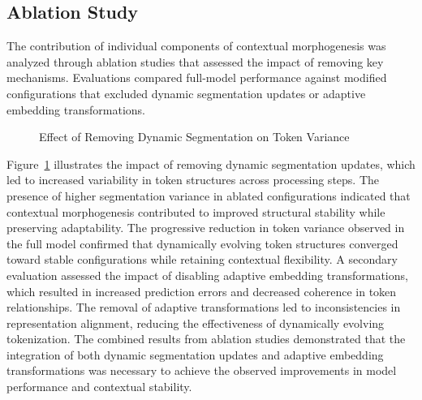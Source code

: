 \documentclass{article}
\begin{document}
\subsection{Ablation Study}

The contribution of individual components of contextual morphogenesis was analyzed through ablation studies that assessed the impact of removing key mechanisms. Evaluations compared full-model performance against modified configurations that excluded dynamic segmentation updates or adaptive embedding transformations.

\begin{figure}[t]
	\centering
	\caption{Effect of Removing Dynamic Segmentation on Token Variance}
	\label{fig:ablation_variance}
\end{figure}

Figure~\ref{fig:ablation_variance} illustrates the impact of removing dynamic segmentation updates, which led to increased variability in token structures across processing steps. The presence of higher segmentation variance in ablated configurations indicated that contextual morphogenesis contributed to improved structural stability while preserving adaptability. The progressive reduction in token variance observed in the full model confirmed that dynamically evolving token structures converged toward stable configurations while retaining contextual flexibility. A secondary evaluation assessed the impact of disabling adaptive embedding transformations, which resulted in increased prediction errors and decreased coherence in token relationships. The removal of adaptive transformations led to inconsistencies in representation alignment, reducing the effectiveness of dynamically evolving tokenization. The combined results from ablation studies demonstrated that the integration of both dynamic segmentation updates and adaptive embedding transformations was necessary to achieve the observed improvements in model performance and contextual stability.
\end{document}
